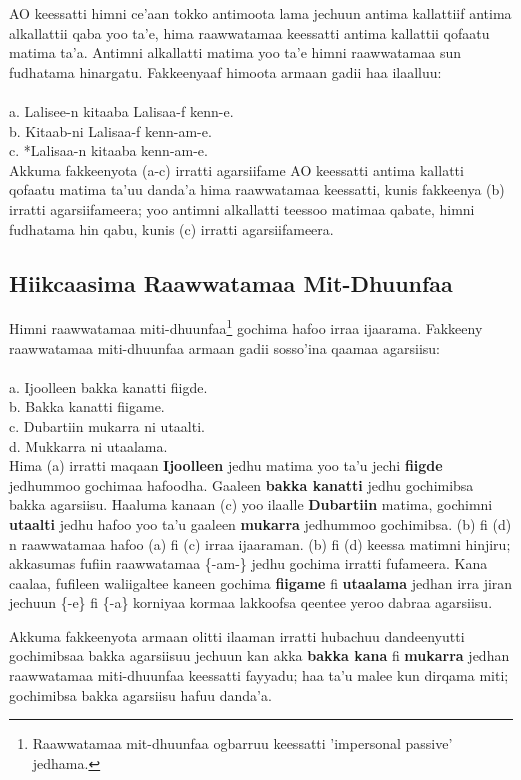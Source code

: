 \documentclass[11pt,b5paper]{book}
\begin{document}
AO keessatti himni ce’aan tokko antimoota lama jechuun antima kallattiif antima alkallattii qaba yoo ta’e, hima raawwatamaa keessatti antima kallattii qofaatu matima ta’a. Antimni alkallatti matima yoo ta’e himni raawwatamaa sun fudhatama hinargatu. Fakkeenyaaf himoota armaan gadii haa ilaalluu:\\
\\
a. Lalisee-n kitaaba Lalisaa-f kenn-e.\\
b. Kitaab-ni Lalisaa-f kenn-am-e.\\
c. *Lalisaa-n kitaaba kenn-am-e.\\

Akkuma fakkeenyota (a-c) irratti agarsiifame AO keessatti antima kallatti qofaatu matima ta’uu danda’a hima raawwatamaa keessatti, kunis fakkeenya (b) irratti agarsiifameera; yoo antimni alkallatti teessoo matimaa qabate, himni fudhatama hin qabu, kunis (c) irratti agarsiifameera. 

\subsection{Hiikcaasima Raawwatamaa Mit-Dhuunfaa }
Himni raawwatamaa miti-dhuunfaa\footnote{Raawwatamaa mit-dhuunfaa ogbarruu keessatti 'impersonal passive' jedhama.} gochima hafoo irraa ijaarama. Fakkeeny raawwatamaa miti-dhuunfaa armaan gadii
sosso’ina qaamaa agarsiisu: \\
\\
a. Ijoolleen bakka kanatti fiigde.\\
b. Bakka kanatti fiigame.\\
c. Dubartiin mukarra ni utaalti.\\
d. Mukkarra ni utaalama. \\

Hima (a) irratti maqaan \textbf{Ijoolleen} jedhu matima yoo ta’u jechi \textbf{fiigde} jedhummoo gochimaa hafoodha. Gaaleen \textbf{bakka kanatti} jedhu gochimibsa bakka agarsiisu. Haaluma kanaan (c) yoo ilaalle \textbf{Dubartiin} matima, gochimni \textbf{utaalti} jedhu hafoo yoo ta’u gaaleen \textbf{mukarra} jedhummoo gochimibsa. (b) fi (d) n raawwatamaa hafoo (a) fi (c) irraa ijaaraman. (b) fi (d) keessa matimni hinjiru; akkasumas fufiin raawwatamaa \{-am-\} jedhu gochima irratti fufameera. Kana caalaa, fufileen waliigaltee kaneen gochima \textbf{fiigame} fi \textbf{utaalama} jedhan irra jiran jechuun \{-e\} fi \{-a\} korniyaa kormaa lakkoofsa qeentee yeroo dabraa agarsiisu.

Akkuma fakkeenyota armaan olitti ilaaman irratti hubachuu dandeenyutti gochimibsaa bakka agarsiisuu jechuun kan akka \textbf{bakka kana} fi \textbf{mukarra} jedhan raawwatamaa miti-dhuunfaa
keessatti fayyadu; haa ta’u malee kun dirqama miti; gochimibsa bakka agarsiisu hafuu danda’a.
\end{document}
